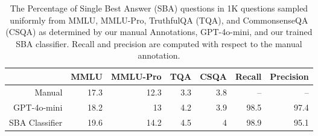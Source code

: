 \begin{table*}[th!]
\begin{adjustbox}{max width=1.0\linewidth}
\begin{tabular}{rrrrrrr}
\toprule
&\textbf{MMLU}&\textbf{MMLU-Pro}&\textbf{TQA}&\textbf{CSQA}&\textbf{Recall}&\textbf{Precision}\\
\midrule
Manual&17.3 &12.3 &3.3 &3.8 &--&--\\
GPT-4o-mini&18.2 &13 &4.2 &3.9 &98.5 &97.4\\
SBA Classifier &19.6&14.2&4.5&4 &98.9&95.1\\
\bottomrule
\end{tabular}
\end{adjustbox}
\caption{The Percentage of Single Best Answer (SBA) questions in 1K questions sampled uniformly from  MMLU, MMLU-Pro, TruthfulQA (TQA), and CommonsenseQA (CSQA) as determined by our manual Annotations, GPT-4o-mini, and our trained SBA classifier. Recall and precision are computed with respect to the manual annotation.
}
\label{tab:detailed-sba-percentages}
\end{table*}


